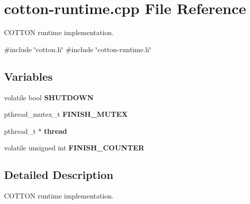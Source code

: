\hypertarget{cotton-runtime_8cpp}{}\section{cotton-\/runtime.cpp File Reference}
\label{cotton-runtime_8cpp}


C\+O\+T\+T\+ON runtime implementation.  


{\ttfamily \#include \char`\"{}cotton.\+h\char`\"{}}\newline
{\ttfamily \#include \char`\"{}cotton-\/runtime.\+h\char`\"{}}\newline
\subsection*{Variables}
\begin{DoxyCompactItemize}
\item 
\mbox{\label{cotton-runtime_8cpp_a13cb9e7359e25d81accdcab8439de6fa}} 
volatile bool {\bfseries S\+H\+U\+T\+D\+O\+WN}
\item 
\mbox{\label{cotton-runtime_8cpp_a6900e7a5c0503eb1a78e5bda2da68445}} 
pthread\+\_\+mutex\+\_\+t {\bfseries F\+I\+N\+I\+S\+H\+\_\+\+M\+U\+T\+EX}
\item 
\mbox{\label{cotton-runtime_8cpp_a6b67ec3785df1f36469a10e68b64ab6f}} 
pthread\+\_\+t $\ast$ {\bfseries thread}
\item 
\mbox{\label{cotton-runtime_8cpp_a3332edc532d465f37afc25ee6946f152}} 
volatile unsigned int {\bfseries F\+I\+N\+I\+S\+H\+\_\+\+C\+O\+U\+N\+T\+ER}
\end{DoxyCompactItemize}


\subsection{Detailed Description}
C\+O\+T\+T\+ON runtime implementation. 

